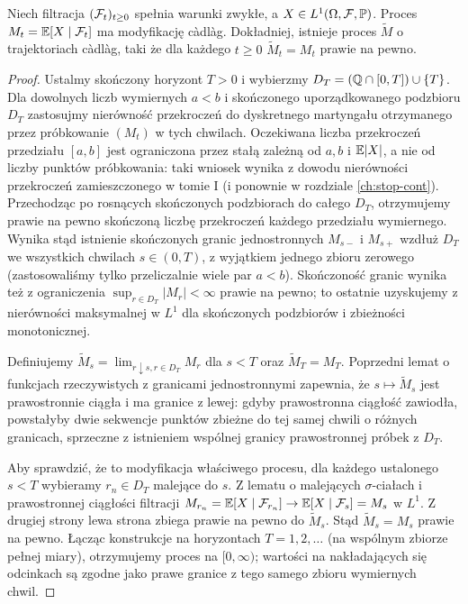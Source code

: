 \begin{twierdzenie}
\label{thm:regularizacja}
Niech filtracja $(\mathcal{F}_t)_{t\ge0}$ spełnia warunki zwykłe,
a $X\in L^1(\Omega,\mathcal{F},\mathbb{P})$. Proces
$M_t=\mathbb{E}[X\mid\mathcal{F}_t]$ ma modyfikację c\`adl\`ag.
Dokładniej, istnieje proces $\widetilde M$ o trajektoriach
c\`adl\`ag, taki że dla każdego $t\ge0$
$\widetilde M_t=M_t$ prawie na pewno.
\end{twierdzenie}
\begin{proof}
Ustalmy skończony horyzont $T>0$ i wybierzmy
$D_T=(\mathbb{Q}\cap[0,T])\cup\{T\}$. Dla dowolnych liczb
wymiernych $a<b$ i skończonego uporządkowanego podzbioru
$D_T$ zastosujmy nierówność przekroczeń do dyskretnego
martyngału otrzymanego przez próbkowanie $(M_t)$ w tych
chwilach. Oczekiwana liczba przekroczeń przedziału
$[a,b]$ jest ograniczona przez stałą zależną od
$a,b$ i $\mathbb{E}|X|$, a nie od liczby punktów próbkowania:
taki wniosek wynika z dowodu nierówności przekroczeń
zamieszczonego w tomie I (i ponownie w rozdziale
\ref{ch:stop-cont}). Przechodząc po rosnących skończonych
podzbiorach do całego $D_T$, otrzymujemy prawie na pewno
skończoną liczbę przekroczeń każdego przedziału
wymiernego. Wynika stąd istnienie skończonych granic
jednostronnych $M_{s-}$ i $M_{s+}$ wzdłuż $D_T$
we wszystkich chwilach $s\in(0,T)$, z wyjątkiem jednego
zbioru zerowego (zastosowaliśmy tylko przeliczalnie wiele
par $a<b$). Skończoność granic wynika też z ograniczenia
$\sup_{r\in D_T}|M_r|<\infty$ prawie na pewno;
to ostatnie uzyskujemy z nierówności maksymalnej w $L^1$
dla skończonych podzbiorów i zbieżności monotonicznej.

Definiujemy $\widetilde M_s=\lim_{r\downarrow s,r\in D_T}M_r$
dla $s<T$ oraz $\widetilde M_T=M_T$. Poprzedni lemat
o funkcjach rzeczywistych z granicami jednostronnymi
zapewnia, że $s\mapsto\widetilde M_s$ jest prawostronnie
ciągła i ma granice z lewej: gdyby prawostronna ciągłość
zawiodła, powstałyby dwie sekwencje punktów zbieżne do
tej samej chwili o różnych granicach, sprzeczne z istnieniem
wspólnej granicy prawostronnej próbek z $D_T$.

Aby sprawdzić, że to modyfikacja właściwego procesu, dla
każdego ustalonego $s<T$ wybieramy $r_n\in D_T$ malejące
do $s$. Z lematu o malejących $\sigma$-ciałach i prawostronnej
ciągłości filtracji
$M_{r_n}=\mathbb{E}[X\mid\mathcal{F}_{r_n}]\to
\mathbb{E}[X\mid\mathcal{F}_s]=M_s$ w $L^1$.
Z drugiej strony lewa strona zbiega prawie na pewno do
$\widetilde M_s$. Stąd $\widetilde M_s=M_s$ prawie na pewno.
Łącząc konstrukcje na horyzontach $T=1,2,\ldots$
(na wspólnym zbiorze pełnej miary), otrzymujemy proces
na $[0,\infty)$; wartości na nakładających się odcinkach
są zgodne jako prawe granice z tego samego zbioru
wymiernych chwil.
\end{proof}

